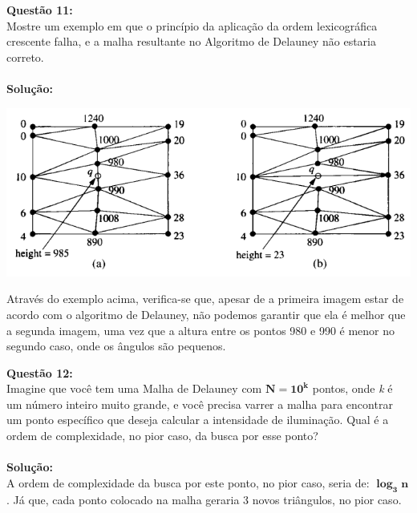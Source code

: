 \noindent\textbf{Questão 11:}\\
Mostre um exemplo em que o princípio da aplicação da ordem lexicográfica crescente
falha, e a malha resultante no Algoritmo de Delauney não estaria correto.
\\
\\
\noindent\textbf{Solução:}\\
\begin{center}
    \includegraphics[]{img_07.png}
\end{center}
Através do exemplo acima, verifica-se que, apesar de a primeira imagem estar de acordo com o algoritmo de Delauney, não podemos garantir que ela é melhor que a segunda imagem, uma vez que a altura entre os pontos 980 e 990 é menor no segundo caso, onde os ângulos são pequenos.
\vspace{1cm}

\noindent\textbf{Questão 12:}\\
Imagine que você tem uma Malha de Delauney com $\mathbf{N = 10^k}$ pontos, onde \emph{k} é um número
inteiro muito grande, e você precisa varrer a malha para encontrar um ponto específico
que deseja calcular a intensidade de iluminação. Qual é a ordem de complexidade, no
pior caso, da busca por esse ponto?
\\
\\
\noindent\textbf{Solução:}\\
A ordem de complexidade da busca por este ponto, no pior caso, seria de: $\mathbf{\log_3 n}$. Já que, cada ponto colocado na malha geraria 3 novos triângulos, no pior caso.
\vspace{1cm}



